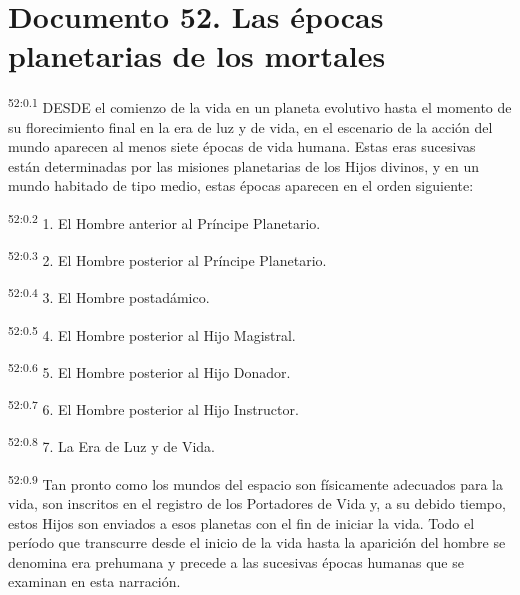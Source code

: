 \chapter{Documento 52. Las épocas planetarias de los mortales}
\par
\textsuperscript{52:0.1} DESDE el comienzo de la vida en un planeta evolutivo hasta el momento de su florecimiento final en la era de luz y de vida, en el escenario de la acción del mundo aparecen al menos siete épocas de vida humana. Estas eras sucesivas están determinadas por las misiones planetarias de los Hijos divinos, y en un mundo habitado de tipo medio, estas épocas aparecen en el orden siguiente:

\par
\textsuperscript{52:0.2} 1. El Hombre anterior al Príncipe Planetario.

\par
\textsuperscript{52:0.3} 2. El Hombre posterior al Príncipe Planetario.

\par
\textsuperscript{52:0.4} 3. El Hombre postadámico.

\par
\textsuperscript{52:0.5} 4. El Hombre posterior al Hijo Magistral.

\par
\textsuperscript{52:0.6} 5. El Hombre posterior al Hijo Donador.

\par
\textsuperscript{52:0.7} 6. El Hombre posterior al Hijo Instructor.

\par
\textsuperscript{52:0.8} 7. La Era de Luz y de Vida.

\par
\textsuperscript{52:0.9} Tan pronto como los mundos del espacio son físicamente adecuados para la vida, son inscritos en el registro de los Portadores de Vida y, a su debido tiempo, estos Hijos son enviados a esos planetas con el fin de iniciar la vida. Todo el período que transcurre desde el inicio de la vida hasta la aparición del hombre se denomina era prehumana y precede a las sucesivas épocas humanas que se examinan en esta narración.

